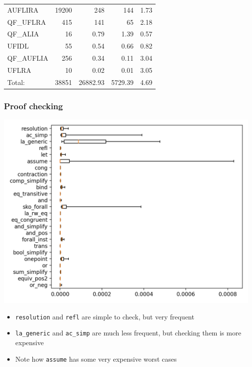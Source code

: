 \documentclass[usepdftitle=false,aspectratio=169]{beamer}
\newcommand\vitem{\vfill\item}
\begin{document}
\begin{frame}
\begin{minipage}{0.68 \textwidth}
\begin{tabular}{l|r|r|r|r}
      AUFLIRA & 19200 & 248 & 144 & 1.73 \\
      QF\_UFLRA & 415 & 141 & 65 & 2.18 \\
      QF\_ALIA & 16 & 0.79 & 1.39 & 0.57 \\
      UFIDL & 55 & 0.54 & 0.66 & 0.82 \\
      QF\_AUFLIA & 256 & 0.34 & 0.11 & 3.04 \\
      UFLRA & 10 & 0.02 & 0.01 & 3.05 \\
      \midrule
      Total: & 38851 & 26882.93 & 5729.39 & 4.69 \\
      \bottomrule
    \end{tabular}
  \end{minipage}
\end{frame}

\begin{frame}
  \frametitle{Proof checking}
  \begin{minipage}{0.64 \textwidth}
    \centering
    \includegraphics[height=0.9\textheight]{images/by-rules-boxplot.png}
  \end{minipage}
  \hfill
  \begin{minipage}[c][0.8 \textheight]{0.3 \textwidth}
    \begin{itemize}
      \item \texttt{resolution} and \texttt{refl} are simple to check, but very
      frequent
      \vitem \texttt{la\_generic} and \texttt{ac\_simp} are much less frequent,
      but checking them is more expensive
      \vitem Note how \texttt{assume} has some very expensive worst cases
      \vfill
    \end{itemize}
  \end{minipage}
\end{frame}
\end{document}
